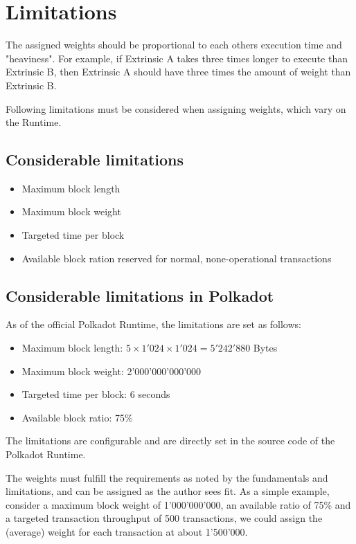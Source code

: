 \documentclass[11pt,a4paper]{article}
\begin{document}
\section{Limitations}\label{sec:limitations}
The assigned weights should be proportional to each others execution time and
"heaviness". For example, if Extrinsic A takes three times longer to execute
than Extrinsic B, then Extrinsic A should have three times the amount of weight
than Extrinsic B.
\newline

Following limitations must be considered when assigning weights, which vary on
the Runtime.

\subsection{Considerable limitations}
\begin{itemize}
\item Maximum block length
\item Maximum block weight
\item Targeted time per block
\item Available block ration reserved for normal, none-operational transactions
\end{itemize}

\subsection{Considerable limitations in Polkadot}
As of the official Polkadot Runtime, the limitations are set as follows:

\begin{itemize}
\item Maximum block length: $5 \times 1'024 \times 1'024 = 5'242'880$ Bytes
\item Maximum block weight: 2'000'000'000'000
\item Targeted time per block: 6 seconds
\item Available block ratio: 75\%
\end{itemize}

The limitations are configurable and are directly set in the source code of the
Polkadot Runtime.
\newline

The weights must fulfill the requirements as noted by the fundamentals and
limitations, and can be assigned as the author sees fit. As a simple example,
consider a maximum block weight of 1'000'000'000, an available ratio of 75\% and
a targeted transaction throughput of 500 transactions, we could assign the
(average) weight for each transaction at about 1'500'000.
\newline
\end{document}

